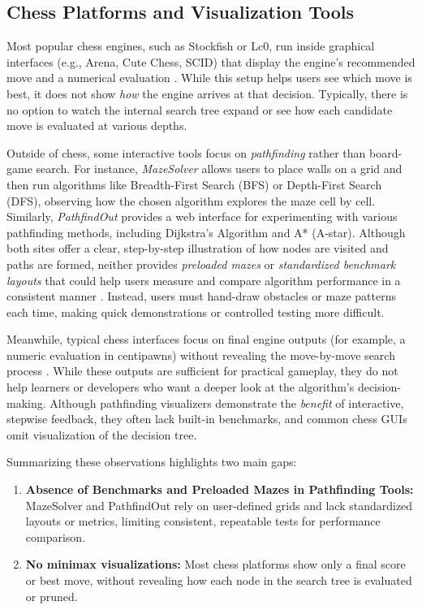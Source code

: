 \documentclass[12pt,a4paper]{article}
\begin{document}
\subsection{Chess Platforms and Visualization Tools}
\label{sec:chess_and_visualization}

Most popular chess engines, such as Stockfish or Lc0, run inside graphical interfaces (e.g., Arena, Cute Chess, SCID) that display the engine’s recommended move and a numerical evaluation \cite{stockfishdocs,lichessEngineIntegration,arenaDocs,cuTechessDocs,scidDocs}. While this setup helps users see which move is best, it does not show \emph{how} the engine arrives at that decision. Typically, there is no option to watch the internal search tree expand or see how each candidate move is evaluated at various depths.

Outside of chess, some interactive tools focus on \emph{pathfinding} rather than board-game search. For instance, \emph{MazeSolver} \cite{mazeSolverSite} allows users to place walls on a grid and then run algorithms like Breadth-First Search (BFS) or Depth-First Search (DFS), observing how the chosen algorithm explores the maze cell by cell. Similarly, \emph{PathfindOut} \cite{pathfindoutSite} provides a web interface for experimenting with various pathfinding methods, including Dijkstra’s Algorithm and A* (A-star). Although both sites offer a clear, step-by-step illustration of how nodes are visited and paths are formed, neither provides \emph{preloaded mazes} or \emph{standardized benchmark layouts} that could help users measure and compare algorithm performance in a consistent manner \cite{SomePathfindingDiscussion}. Instead, users must hand-draw obstacles or maze patterns each time, making quick demonstrations or controlled testing more difficult.

Meanwhile, typical chess interfaces focus on final engine outputs (for example, a numeric evaluation in centipawns) without revealing the move-by-move search process \cite{AlphaBetaTutorial}. While these outputs are sufficient for practical gameplay, they do not help learners or developers who want a deeper look at the algorithm’s decision-making. Although pathfinding visualizers demonstrate the \emph{benefit} of interactive, stepwise feedback, they often lack built-in benchmarks, and common chess GUIs omit visualization of the decision tree.

Summarizing these observations highlights two main gaps:
\begin{enumerate}
    \item \textbf{Absence of Benchmarks and Preloaded Mazes in Pathfinding Tools:}
    MazeSolver \cite{mazeSolverSite} and PathfindOut \cite{pathfindoutSite} rely on user-defined grids and lack standardized layouts or metrics, limiting consistent, repeatable tests for performance comparison.
    \item \textbf{No minimax visualizations:}
    Most chess platforms show only a final score or best move, without revealing how each node in the search tree is evaluated or pruned.
\end{enumerate}
\end{document}
